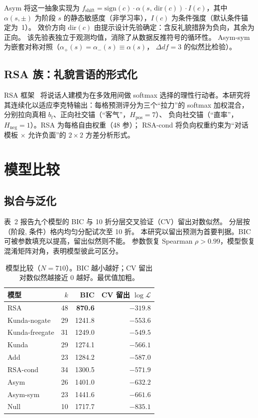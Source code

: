\documentclass[11pt,a4paper]{ctexart}
\begin{document}
Asym 将这一抽象实现为 $f_{\text{shift}} = \mathrm{sign}(c) \cdot
\alpha(s,\,\mathrm{dir}(c)) \cdot I(c)$，其中 $\alpha(s,\pm)$ 为阶段 $s$
的静态敏感度（非学习率），$I(c)$ 为条件强度（默认条件锚定为~1）。
效价方向 $\mathrm{dir}(c)$ 由提示设计先验确定：含反礼貌措辞为负向，其余为正向。
该先验表独立于观测均值，消除了从数据反推符号的循环性。
Asym-sym 为嵌套对称对照（$\alpha_+(s) = \alpha_-(s) \equiv \alpha(s)$，
$\Delta df = 3$ 的似然比检验）。

\subsection{RSA 族：礼貌言语的形式化}

RSA 框架~\citep{frank2012pragmatic,yoon2020polite} 将说话人建模为在多效用间做 softmax
选择的理性行动者。本研究将其连续化以适应李克特输出：每格预测评分为三个``拉力''的
softmax 加权混合，分别拉向真相 $b_t$、正向社交锚（``客气''，$H_{\text{pos}} = 7$）、
负向社交锚（``直率''，$H_{\text{neg}} = 1$）。RSA 为每格自由权重（48 参）；
RSA-cond 将负向权重约束为``对话模板 $\times$ 允许负面''的 $2 \times 2$
方差分析形式。

\section{模型比较}

\subsection{拟合与泛化}

表~2 报告九个模型的 BIC 与 10 折分层交叉验证（CV）留出对数似然。
分层按（阶段, 条件）格内均匀分配试次至 10 折。
本研究以留出预测为首要判据。BIC 可被参数填充以提高，留出似然则不能。
参数恢复 Spearman $\rho > 0.99$，模型恢复混淆矩阵对角，表明模型彼此可区分。

\begin{table}[t]
\centering\small
\caption{模型比较（$N = 710$）。BIC 越小越好；CV 留出对数似然越接近 0 越好。最优值加粗。}
\label{tab:fit}
\begin{tabular}{lrrr}
\toprule
模型 & $k$ & BIC & CV 留出 $\log\mathcal{L}$ \\
\midrule
RSA & 48 & \textbf{870.6} & \textbf{$-319.8$} \\
Kunda-nogate & 29 & 1241.8 & $-553.6$ \\
Kunda-freegate & 31 & 1249.0 & $-549.5$ \\
Kunda & 29 & 1274.1 & $-566.1$ \\
Add & 23 & 1284.2 & $-587.0$ \\
RSA-cond & 34 & 1300.5 & $-571.9$ \\
Asym & 26 & 1401.0 & $-632.2$ \\
Asym-sym & 23 & 1441.6 & $-661.6$ \\
Null & 10 & 1717.7 & $-835.1$ \\
\bottomrule
\end{tabular}
\end{table}
\end{document}
